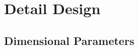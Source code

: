 \section{Detail Design} %
\label{sec:detaildesign}




\subsection{Dimensional Parameters}
\label{ssec:sizing}


